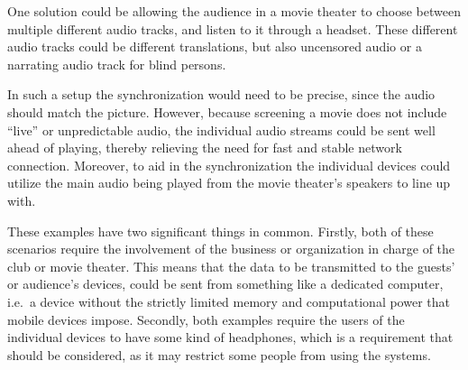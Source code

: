 \begin{description}
        One solution could be allowing the audience in a movie theater to choose between multiple different audio tracks, and listen to it through a headset.
        These different audio tracks could be different translations, but also uncensored audio or a narrating audio track for blind persons.

        In such a setup the synchronization would need to be precise, since the audio should match the picture.
        However, because screening a movie does not include \enquote{live} or unpredictable audio, the individual audio streams could be sent well ahead of playing,
        thereby relieving the need for fast and stable network connection.
        Moreover, to aid in the synchronization the individual devices could utilize the main audio being played from the movie theater's speakers to line up with.
\end{description}

These examples have two significant things in common.
Firstly, both of these scenarios require the involvement of the business or organization in charge of the club or movie theater.
This means that the data to be transmitted to the guests' or audience's devices, could be sent from something like a dedicated computer, i.e.~a device without the strictly limited memory and computational power that mobile devices impose.
Secondly, both examples require the users of the individual devices to have some kind of headphones, which is a requirement that should be considered, as it may restrict some people from using the systems.
